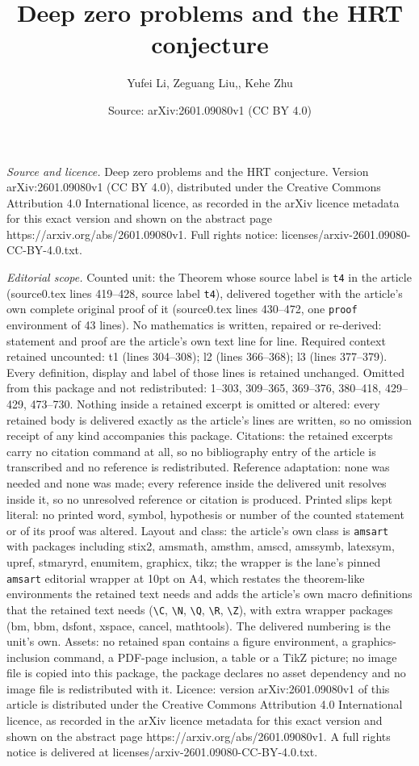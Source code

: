 \documentclass[10pt,a4paper]{amsart}
\title[Deep zero problems and the HRT conjecture]{Deep zero problems and the HRT conjecture}
\author{Yufei Li, Zeguang Liu,, Kehe Zhu}
\date{Source: arXiv:2601.09080v1 (CC BY 4.0)}
\begin{document}
\maketitle

\noindent\emph{Source and licence.} Deep zero problems and the HRT conjecture. Version arXiv:2601.09080v1 (CC BY 4.0), distributed under the Creative Commons Attribution 4.0 International licence, as recorded in the arXiv licence metadata for this exact version and shown on the abstract page https://arxiv.org/abs/2601.09080v1. Full rights notice: licenses/arxiv-2601.09080-CC-BY-4.0.txt.\par\smallskip

\noindent\textit{Editorial scope.} Counted unit: the Theorem whose source label is \texttt{t4} in the article (source0.tex lines 419--428, source label \texttt{t4}), delivered together with the article's own complete original proof of it (source0.tex lines 430--472, one \texttt{proof} environment of 43 lines). No mathematics is written, repaired or re-derived: statement and proof are the article's own text line for line. Required context retained uncounted: t1 (lines 304--308); l2 (lines 366--368); l3 (lines 377--379). Every definition, display and label of those lines is retained unchanged. Omitted from this package and not redistributed: 1--303, 309--365, 369--376, 380--418, 429--429, 473--730. Nothing inside a retained excerpt is omitted or altered: every retained body is delivered exactly as the article's lines are written, so no omission receipt of any kind accompanies this package. Citations: the retained excerpts carry no citation command at all, so no bibliography entry of the article is transcribed and no reference is redistributed. Reference adaptation: none was needed and none was made; every reference inside the delivered unit resolves inside it, so no unresolved reference or citation is produced. Printed slips kept literal: no printed word, symbol, hypothesis or number of the counted statement or of its proof was altered. Layout and class: the article's own class is \texttt{amsart} with packages including stix2, amsmath, amsthm, amscd, amssymb, latexsym, upref, stmaryrd, enumitem, graphicx, tikz; the wrapper is the lane's pinned \texttt{amsart} editorial wrapper at 10pt on A4, which restates the theorem-like environments the retained text needs and adds the article's own macro definitions that the retained text needs (\texttt{\textbackslash C}, \texttt{\textbackslash N}, \texttt{\textbackslash Q}, \texttt{\textbackslash R}, \texttt{\textbackslash Z}), with extra wrapper packages (bm, bbm, dsfont, xspace, cancel, mathtools). The delivered numbering is the unit's own. Assets: no retained span contains a figure environment, a graphics-inclusion command, a PDF-page inclusion, a table or a TikZ picture; no image file is copied into this package, the package declares no asset dependency and no image file is redistributed with it. Licence: version arXiv:2601.09080v1 of this article is distributed under the Creative Commons Attribution 4.0 International licence, as recorded in the arXiv licence metadata for this exact version and shown on the abstract page https://arxiv.org/abs/2601.09080v1. A full rights notice is delivered at licenses/arxiv-2601.09080-CC-BY-4.0.txt. 
\end{document}
